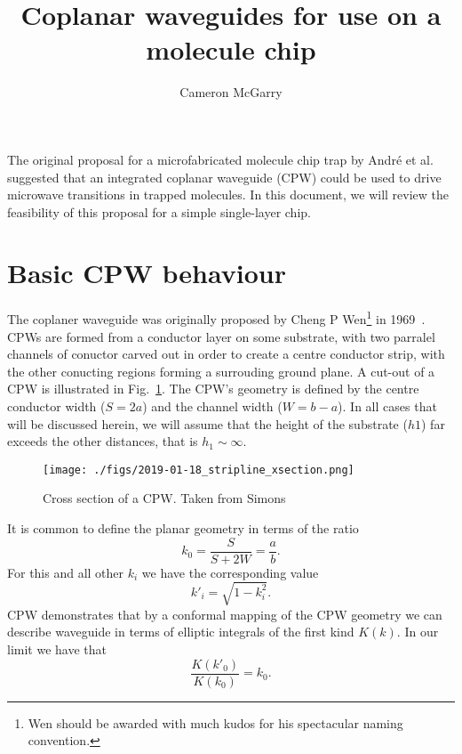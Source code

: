 \documentclass[a4paper]{article}
\title{Coplanar waveguides for use on a molecule chip}
\author{Cameron McGarry}
\begin{document}
\maketitle


The original proposal for a microfabricated molecule chip trap by Andr\'e et
al.~\cite{Andre2006} suggested that an integrated coplanar waveguide (CPW) could
be used to drive microwave transitions in trapped molecules. In this document,
we will review the feasibility of this proposal for a simple single-layer chip.

\section{Basic CPW behaviour}

The coplaner waveguide was originally proposed by Cheng P Wen\footnote{Wen
should be awarded with much kudos for his spectacular naming convention.} in
1969~\cite{1127105}. CPWs are formed from a conductor layer on some substrate,
with two parralel channels of conuctor carved out in order to create a centre
conductor strip, with the other conucting regions forming a surrouding ground
plane. A cut-out of a CPW is illustrated in Fig.~\ref{fig:CPWxsec}. The CPW's
geometry is defined by the centre conductor width ($S=2a$) and the channel width
($W=b-a$). In all cases that will be discussed herein, we will assume that the
height of the substrate ($h1$) far exceeds the other distances, that is $h_1
\sim \infty$.

\begin{figure}
  \texttt{[image: ./figs/2019-01-18\_stripline\_xsection.png]}
  \caption{Cross section of a CPW. Taken from Simons~\cite{Simons2004}}
  \label{fig:CPWxsec}
\end{figure}

It is common to define the planar geometry in terms of the ratio
\begin{equation}
  k_0 = \frac{S}{S+2W} = \frac{a}{b}.
  \label{eqn:k0def}
\end{equation}
For this and all other $k_i$ we have the corresponding value
\begin{equation}
  k'_i = \sqrt{1-k^2_i}.
\end{equation}
CPW demonstrates\cite{1127105} that by a conformal mapping of the CPW geometry
we can describe waveguide in terms of elliptic integrals of the first kind
$K(k)$. In our limit we have that
\begin{equation}
  \frac{K(k'_0)}{K(k_0)} = k_0.
  \label{eqn:k0rat}
\end{equation}
\end{document}
